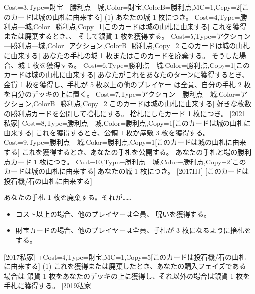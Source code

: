 \documentclass{waku}
\begin{document}
{Cost=3,Type=財宝—勝利点—城,Color=財宝,ColorB=勝利点,MC=1,Copy=2}[このカードは城の山札に由来する]{
	\Vanilla(1){}
	あなたの城 1 枚につき\VP[1]。
}
{Cost=4,Type=勝利点—城,Color=勝利点,Copy=1}[このカードは城の山札に由来する]{
	\Vanilla[1]{}
	これを獲得または廃棄するとき、、
	そして銀貨 1 枚を獲得する。
}
{Cost=5,Type=アクション—勝利点—城,Color=アクション,ColorB=勝利点,Copy=2}[このカードは城の山札に由来する]{
	あなたの手札の城 1 枚またはこのカードを廃棄する。
	そうした場合、城 1 枚を獲得する。
	\hmbar
	\Vanilla[2]{}
}
{Cost=6,Type=勝利点—城,Color=勝利点,Copy=1}[このカードは城の山札に由来する]{
	\Vanilla[2]{}
	\hmbar
	あなたがこれをあなたのターンに獲得するとき、
	金貨 1 枚を獲得し、手札が 5 枚以上の他のプレイヤー
	は全員、自分の手札 2 枚を自分のデッキの上に置く。
}
{Cost=7,Type=アクション—勝利点—城,Color=アクション,ColorB=勝利点,Copy=2}[このカードは城の山札に由来する]{
	好きな枚数の勝利点カードを公開して捨札にする。
	捨札にしたカード 1 枚につき。
	\hmbar
	\Vanilla[3]{}
}[2021私家]
{Cost=8,Type=勝利点—城,Color=勝利点,Copy=1}[このカードは城の山札に由来する]{
	\Vanilla[4]{}
	\hmbar
	これを獲得するとき、公領 1 枚か屋敷 3 枚を獲得する。
}
{Cost=9,Type=勝利点—城,Color=勝利点,Copy=1}[このカードは城の山札に由来する]{
	\Vanilla[5]{}
	\hmbar
	これを獲得するとき、あなたの手札を公開する。
	あなたの手札と場の勝利点カード 1 枚につき。
}
{Cost=10,Type=勝利点—城,Color=勝利点,Copy=2}[このカードは城の山札に由来する]{
	あなたの城 1 枚につき\VP[2]。
}
[2017HJ]
[このカードは投石機/石の山札に由来する]{
	あなたの手札 1 枚を廃棄する。それが……
	\begin{itemize}
		\item コスト以上の場合、他のプレイヤーは全員、
			呪いを獲得する。
		\item 財宝カードの場合、他のプレイヤーは全員、手札が
			3 枚になるように捨札をする。
	\end{itemize}
}[2017私家]
+{Cost=4,Type=財宝,MC=1,Copy=5}[このカードは投石機/石の山札に由来する]{
	\Vanilla(1){}
	\hmbar
	これを獲得または廃棄したとき、あなたの購入フェイズである場合は
	銀貨 1 枚をあなたのデッキの上に獲得し、それ以外の場合は銀貨
	1 枚を手札に獲得する。
}[2019私家]
\end{document}
